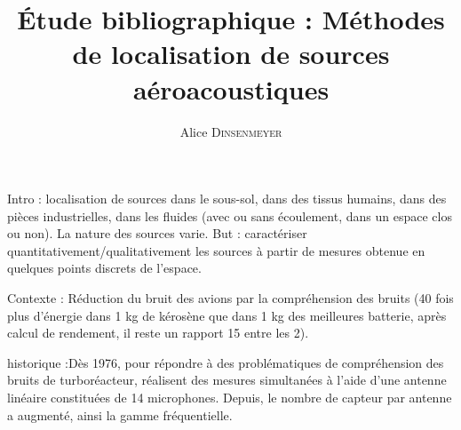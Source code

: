 \documentclass[twocolumn]{article}
\title{
\centering \fontsize{18pt}{10pt}\textbf{Étude bibliographique : Méthodes de localisation de sources aéroacoustiques}
}
\author{
\large{Alice \textsc{Dinsenmeyer}}\\[2mm] %
\vspace{-5mm}
}
\date{}
\begin{document}
\maketitle %

\thispagestyle{fancy} %




Intro : localisation de sources dans le sous-sol, dans des tissus humains, dans des pièces industrielles, dans les fluides (avec ou sans écoulement, dans un espace clos ou non). La nature des sources varie.
But : caractériser quantitativement/qualitativement les sources à partir de mesures obtenue en quelques points  discrets de l'espace.

Contexte : Réduction du bruit des avions par la compréhension des bruits (40 fois plus d'énergie dans 1 kg de kérosène que dans 1 kg des meilleures batterie, après calcul de rendement, il reste un rapport 15 entre les 2).

historique :Dès 1976, pour répondre à des problématiques de compréhension des bruits de turboréacteur, \cite{billingsley_1976} réalisent des mesures simultanées à l'aide d'une antenne linéaire constituées de 14 microphones. 
Depuis, le nombre de capteur par antenne a augmenté, ainsi la gamme fréquentielle.





\end{document}

